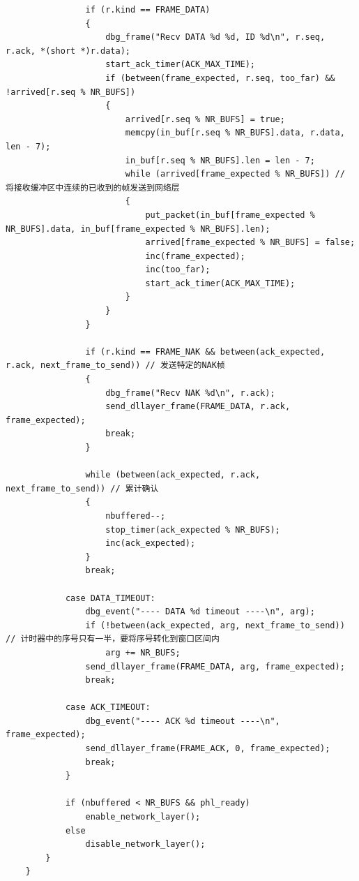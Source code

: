 \documentclass[lang=cn,11pt,a4paper,cite=authornum]{paper}
\begin{document}
\begin{code}
\begin{verbatim}
                if (r.kind == FRAME_DATA)
                {
                    dbg_frame("Recv DATA %d %d, ID %d\n", r.seq, r.ack, *(short *)r.data);
                    start_ack_timer(ACK_MAX_TIME);
                    if (between(frame_expected, r.seq, too_far) && !arrived[r.seq % NR_BUFS])
                    {
                        arrived[r.seq % NR_BUFS] = true;
                        memcpy(in_buf[r.seq % NR_BUFS].data, r.data, len - 7);
                        in_buf[r.seq % NR_BUFS].len = len - 7;
                        while (arrived[frame_expected % NR_BUFS]) // 将接收缓冲区中连续的已收到的帧发送到网络层
                        {
                            put_packet(in_buf[frame_expected % NR_BUFS].data, in_buf[frame_expected % NR_BUFS].len);
                            arrived[frame_expected % NR_BUFS] = false;
                            inc(frame_expected);
                            inc(too_far);
                            start_ack_timer(ACK_MAX_TIME);
                        }
                    }
                }
    
                if (r.kind == FRAME_NAK && between(ack_expected, r.ack, next_frame_to_send)) // 发送特定的NAK帧
                {
                    dbg_frame("Recv NAK %d\n", r.ack);
                    send_dllayer_frame(FRAME_DATA, r.ack, frame_expected);
                    break;
                }
    
                while (between(ack_expected, r.ack, next_frame_to_send)) // 累计确认
                {
                    nbuffered--;
                    stop_timer(ack_expected % NR_BUFS);
                    inc(ack_expected);
                }
                break;
    
            case DATA_TIMEOUT:
                dbg_event("---- DATA %d timeout ----\n", arg);
                if (!between(ack_expected, arg, next_frame_to_send)) // 计时器中的序号只有一半，要将序号转化到窗口区间内
                    arg += NR_BUFS;
                send_dllayer_frame(FRAME_DATA, arg, frame_expected);
                break;
    
            case ACK_TIMEOUT:
                dbg_event("---- ACK %d timeout ----\n", frame_expected);
                send_dllayer_frame(FRAME_ACK, 0, frame_expected);
                break;
            }
    
            if (nbuffered < NR_BUFS && phl_ready)
                enable_network_layer();
            else
                disable_network_layer();
        }
    }
\end{verbatim}
\end{code}
\end{document}
